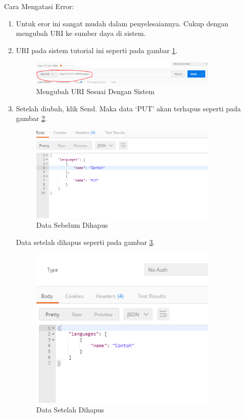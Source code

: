 Cara Mengatasi Error:
\begin{enumerate} 
\item Untuk eror ini sangat mudah dalam penyelesaiannya. Cukup dengan mengubah URI ke sumber daya di sistem.
\item URI pada sistem tutorial ini seperti pada gambar \ref{fig:uus}.
\begin{figure}[!htbp]
	\centerline{\includegraphics[width=0.85\textwidth]{figures/11/uus.PNG}}
	\caption{Mengubah URI Sesuai Dengan Sistem}
	\label{fig:uus}
\end{figure}

\item Setelah diubah, klik Send. Maka data ‘PUT’ akan terhapus seperti pada gambar \ref{fig:dsd}.
\begin{figure}[!htbp]
	\centerline{\includegraphics[width=0.85\textwidth]{figures/11/dsd.PNG}}
	\caption{Data Sebelum Dihapus}
	\label{fig:dsd}
\end{figure}

Data setelah dihapus seperti pada gambar \ref{fig:dsh}.
\begin{figure}[!htbp]
	\centerline{\includegraphics[width=0.85\textwidth]{figures/11/dsh.PNG}}
	\caption{Data Setelah Dihapus}
	\label{fig:dsh}
\end{figure}
\end{enumerate}